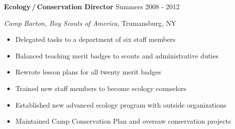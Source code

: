 
\vspace{7pt}

\textbf{Ecology\,/\,Conservation Director} \hfill Summers 2008 - 2012

\textit{Camp Barton, Boy Scouts of America}, Trumansburg, NY

\begin{itemize}
    \item Delegated tasks to a department of six staff members
    \item Balanced teaching merit badges to scouts and administrative duties
    \item Rewrote lesson plans for all twenty merit badges
    \item Trained new staff members to become ecology counselors
    \item Established new advanced ecology program with outside organizations
    \item Maintained Camp Conservation Plan and oversaw conservation projects
\end{itemize}
